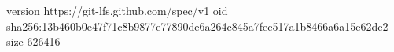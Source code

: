version https://git-lfs.github.com/spec/v1
oid sha256:13b460b0e47f71c8b9877e77890de6a264c845a7fec517a1b8466a6a15e62dc2
size 626416
